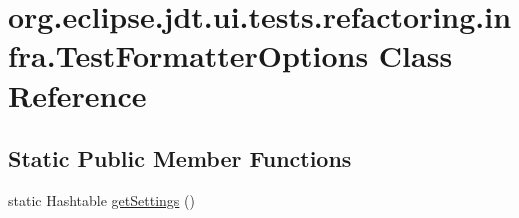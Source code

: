 \hypertarget{classorg_1_1eclipse_1_1jdt_1_1ui_1_1tests_1_1refactoring_1_1infra_1_1TestFormatterOptions}{
\section{org.eclipse.jdt.ui.tests.refactoring.infra.TestFormatterOptions Class Reference}
\label{classorg_1_1eclipse_1_1jdt_1_1ui_1_1tests_1_1refactoring_1_1infra_1_1TestFormatterOptions}
}
\subsection*{Static Public Member Functions}
\begin{DoxyCompactItemize}
\item 
static Hashtable \hyperlink{classorg_1_1eclipse_1_1jdt_1_1ui_1_1tests_1_1refactoring_1_1infra_1_1TestFormatterOptions_ad4d77d97b21117f1d30b9efcbb9384a4}{getSettings} ()
\end{DoxyCompactItemize}
